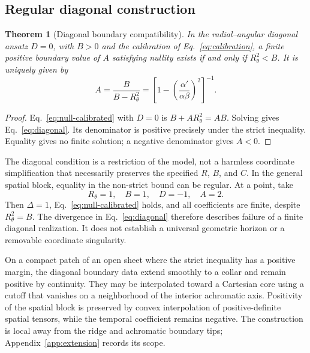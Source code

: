 \documentclass[11pt,letterpaper]{article}
\theoremstyle{plain}
\newtheorem{theorem}[proposition]{Theorem}
\begin{document}
\subsection{Regular diagonal construction}
\begin{theorem}[Diagonal boundary compatibility]
\label{thm:diagonal}
In the radial--angular diagonal ansatz $D=0$, with $B>0$ and the calibration of Eq.~\eqref{eq:calibration}, a finite positive boundary value of $A$ satisfying nullity exists if and only if $R_\theta^2<B$. It is uniquely given by
\begin{equation}
 A=\frac{B}{B-R_\theta^2}
 =\left[1-\left(\frac{\alpha'}{\alpha\beta}\right)^2\right]^{-1}.
 \label{eq:diagonal}
\end{equation}
\end{theorem}
\begin{proof}
Eq.~\eqref{eq:null-calibrated} with $D=0$ is $B+AR_\theta^2=AB$. Solving gives Eq.~\eqref{eq:diagonal}. Its denominator is positive precisely under the strict inequality. Equality gives no finite solution; a negative denominator gives $A<0$.
\end{proof}

The diagonal condition is a restriction of the model, not a harmless coordinate simplification that necessarily preserves the specified $R$, $B$, and $C$. In the general spatial block, equality in the non-strict bound can be regular. At a point, take
\begin{equation}
 R_\theta=1,\quad B=1,\quad D=-1,\quad A=2.
 \label{eq:equality}
\end{equation}
Then $\Delta=1$, Eq.~\eqref{eq:null-calibrated} holds, and all coefficients are finite, despite $R_\theta^2=B$. The divergence in Eq.~\eqref{eq:diagonal} therefore describes failure of a finite diagonal realization. It does not establish a universal geometric horizon or a removable coordinate singularity.

On a compact patch of an open sheet where the strict inequality has a positive margin, the diagonal boundary data extend smoothly to a collar and remain positive by continuity. They may be interpolated toward a Cartesian core using a cutoff that vanishes on a neighborhood of the interior achromatic axis. Positivity of the spatial block is preserved by convex interpolation of positive-definite spatial tensors, while the temporal coefficient remains negative. The construction is local away from the ridge and achromatic boundary tips; Appendix~\ref{app:extension} records its scope.
\end{document}
